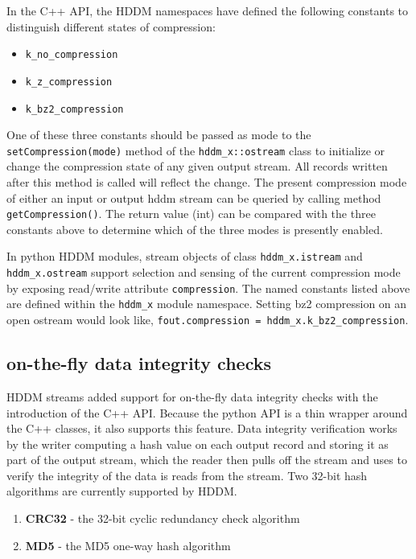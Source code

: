 \documentclass{revtex4}
\begin{document}
In the C++ API, the HDDM namespaces have defined the following constants
to distinguish different states of compression:

\begin{itemize}
\item \texttt{k\_no\_compression}
\item \texttt{k\_z\_compression}
\item \texttt{k\_bz2\_compression}
\end{itemize}

One of these three constants should be passed as mode to the 
\texttt{setCompression(mode)} method of the \texttt{hddm\_x::ostream}
class to initialize or change the compression state of any given output
stream. All records written after this method is called will reflect the
change. The present compression mode of either an input or output hddm
stream can be queried by calling method \texttt{getCompression()}.
The return value (int) can be compared with the three constants above
to determine which of the three modes is presently enabled.

In python HDDM modules, stream objects of class \texttt{hddm\_x.istream}
and \texttt{hddm\_x.ostream} support selection and sensing of the current
compression mode by exposing read/write attribute \texttt{compression}.
The named constants listed above are defined within the \texttt{hddm\_x}
module namespace. Setting bz2 compression on an open ostream would look
like, \texttt{fout.compression = hddm\_x.k\_bz2\_compression}.

\subsection{on-{}the-{}fly data integrity checks}

HDDM streams added support for on-{}the-{}fly data integrity checks with
the introduction of the C++ API. Because the python API is a thin wrapper
around the C++ classes, it also supports this feature. Data integrity
verification works by the writer computing a hash value on each output
record and storing it as part of the output stream, which the reader then
pulls off the stream and uses to verify the integrity of the data is reads
from the stream. Two 32-{}bit hash algorithms are currently supported by HDDM.

\begin{enumerate}
\item{\bf CRC32} -{} the 32-{}bit cyclic redundancy check algorithm
\item{\bf MD5} -{} the MD5 one-{}way hash algorithm
\end{enumerate}
\end{document}
